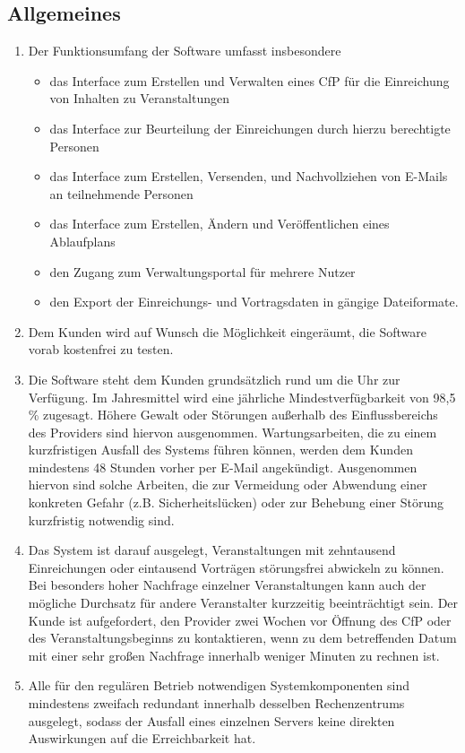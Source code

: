 \documentclass{terms}
\begin{document}
\subsection{Allgemeines}
\begin{enumerate}
\item Der Funktionsumfang der Software umfasst insbesondere \begin{itemize}
\item das Interface zum Erstellen und Verwalten eines CfP für die Einreichung von Inhalten zu Veranstaltungen
\item das Interface zur Beurteilung der Einreichungen durch hierzu berechtigte Personen
\item das Interface zum Erstellen, Versenden, und Nachvollziehen von E-Mails an teilnehmende Personen
\item das Interface zum Erstellen, Ändern und Veröffentlichen eines Ablaufplans
\item den Zugang zum Verwaltungsportal für mehrere Nutzer
\item den Export der Einreichungs- und Vortragsdaten in gängige Dateiformate.
\end{itemize}
\item Dem Kunden wird auf Wunsch die Möglichkeit eingeräumt, die Software vorab kostenfrei zu testen.
\item Die Software steht dem Kunden grundsätzlich rund um die Uhr zur Verfügung.
      Im Jahresmittel wird eine jährliche Mindestverfügbarkeit von 98,5 \% zugesagt.
      Höhere Gewalt oder Störungen außerhalb des Einflussbereichs des Providers sind hiervon ausgenommen.
      Wartungsarbeiten, die zu einem kurzfristigen Ausfall des Systems führen können, werden dem Kunden mindestens 48 Stunden vorher per E-Mail angekündigt.
      Ausgenommen hiervon sind solche Arbeiten, die zur Vermeidung oder Abwendung einer konkreten Gefahr (z.B. Sicherheitslücken) oder zur Behebung einer Störung kurzfristig notwendig sind.
\item Das System ist darauf ausgelegt, Veranstaltungen mit zehntausend Einreichungen oder eintausend Vorträgen störungsfrei abwickeln zu können.
      Bei besonders hoher Nachfrage einzelner Veranstaltungen kann auch der mögliche Durchsatz für andere Veranstalter kurzzeitig beeinträchtigt sein.
      Der Kunde ist aufgefordert, den Provider zwei Wochen vor Öffnung des CfP oder des Veranstaltungsbeginns zu kontaktieren, wenn zu dem betreffenden Datum mit einer sehr großen Nachfrage innerhalb weniger Minuten zu rechnen ist.
\item Alle für den regulären Betrieb notwendigen Systemkomponenten sind mindestens zweifach redundant innerhalb desselben Rechenzentrums ausgelegt, sodass der Ausfall eines einzelnen Servers keine direkten Auswirkungen auf die Erreichbarkeit hat.

\end{enumerate}
\end{document}
